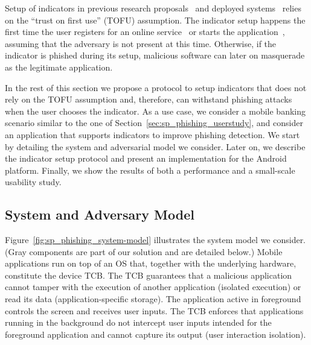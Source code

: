 Setup of indicators in previous research proposals~\cite{tygar96woec,dhamija05soups,zu-woot12} and deployed systems~\cite{boa,vanguard} relies on the ``trust on first use'' (TOFU) assumption.
The indicator setup happens the first time the user registers for an online service~\cite{tygar96woec,dhamija05soups,boa,vanguard} or starts the application~\cite{zu-woot12},
assuming that the adversary is not present at this time.
Otherwise, if the indicator is phished during its setup, malicious software can later on masquerade as the legitimate application.

In the rest of this section we propose a protocol to setup indicators that does not rely on the TOFU assumption and, therefore, can withstand
phishing attacks when the user chooses the indicator.
As a use case, we consider a mobile banking scenario similar to the one of Section~\ref{sec:sp_phishing_userstudy}, and consider an application that supports indicators to improve phishing detection.
We start by detailing the system and adversarial model we consider. 
Later on, we describe the indicator setup protocol and present an implementation for the Android platform.
Finally, we show the results of both a performance and a small-scale usability study.

\subsection{System and Adversary Model}
\label{sec:setup:sp_phishing_system_and_adversary}
%
Figure~\ref{fig:sp_phishing_system-model} illustrates the system model we consider. (Gray components are part of our solution and are detailed below.) Mobile applications run on top of an OS that, together with the underlying hardware, constitute the device TCB.
The TCB guarantees that a malicious application cannot tamper with the execution of another application (isolated execution) or read its data (application-specific storage).
The application active in foreground controls the screen and receives user inputs.
The TCB enforces that applications running in the background do not intercept user inputs intended for the foreground application and cannot capture its output (user interaction isolation).

